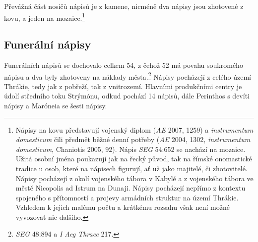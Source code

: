 Převážná část nosičů nápisů je z kamene, nicméně dva nápisy jsou zhotovené z kovu, a jeden na mozaice.\footnote{Nápisy na kovu představují vojenský diplom ({\em AE} 2007, 1259) a {\em instrumentum domesticum} čili předmět běžné denní potřeby ({\em AE} 2004, 1302, {\em instrumentum domesticum}, Chaniotis 2005, 92). Nápis {\em SEG} 54:652 se nachází na mozaice. Užitá osobní jména poukazují jak na řecký původ, tak na římské onomastické tradice u osob, které na nápisech figurují, ať už jako majitelé, či zhotovitelé. Nápisy pocházejí z okolí vojenského tábora v Kabylé a z vojenského tábora ve městě Nicopolis ad Istrum na Dunaji. Nápisy pocházejí nepřímo z kontextu spojeného s přítomností a projevy armádních struktur na území Thrákie. Vzhledem k jejich malému počtu a krátkému rozsahu však není možné vyvozovat nic dalšího.}

\subsection[funerální-nápisy-14]{Funerální nápisy}

Funerálních nápisů se dochovalo celkem 54, z čehož 52 má povahu soukromého nápisu a dva byly zhotoveny na náklady města.\footnote{{\em SEG} 48:894 a {\em I Aeg Thrace} 217.} Nápisy pocházejí z celého území Thrákie, tedy jak z pobřeží, tak z vnitrozemí. Hlavními produkčními centry je údolí středního toku Strýmónu, odkud pochází 14 nápisů, dále Perinthos s devíti nápisy a Maróneia se šesti nápisy.

